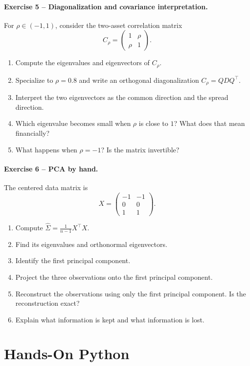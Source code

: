 \documentclass[10pt]{article}
\begin{document}
\paragraph{Exercise 5 -- Diagonalization and covariance interpretation.}
For $\rho\in(-1,1)$, consider the two-asset correlation matrix
\[
C_\rho=
\begin{pmatrix}
1&\rho\\
\rho&1
\end{pmatrix}.
\]

\begin{enumerate}
\item Compute the eigenvalues and eigenvectors of $C_\rho$.
\item Specialize to $\rho=0.8$ and write an orthogonal diagonalization
$C_\rho=QDQ^\top$.
\item Interpret the two eigenvectors as the common direction and the spread
direction.
\item Which eigenvalue becomes small when $\rho$ is close to $1$? What does
that mean financially?
\item What happens when $\rho=-1$? Is the matrix invertible?
\end{enumerate}

\paragraph{Exercise 6 -- PCA by hand.}
The centered data matrix is
\[
X=
\begin{pmatrix}
-1&-1\\
0&0\\
1&1
\end{pmatrix}.
\]

\begin{enumerate}
\item Compute $\widehat{\Sigma}=\frac{1}{n-1}X^\top X$.
\item Find its eigenvalues and orthonormal eigenvectors.
\item Identify the first principal component.
\item Project the three observations onto the first principal component.
\item Reconstruct the observations using only the first principal component.
Is the reconstruction exact?
\item Explain what information is kept and what information is lost.
\end{enumerate}

\section{Hands-On Python}
\end{document}
